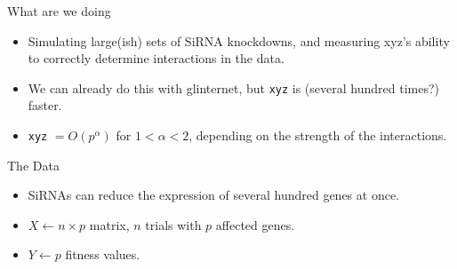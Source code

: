 \begin{frame}{What are we doing}
\begin{itemize}
	\item Simulating large(ish) sets of SiRNA knockdowns, and measuring xyz's ability to correctly determine interactions in the data.
	\item We can already do this with glinternet, but \texttt{xyz} is (several hundred times?) faster.
	\item \texttt{xyz} $= O(p^\alpha)$ for $1 < \alpha < 2$, depending on the strength of the interactions.
\end{itemize}
\end{frame}

\begin{frame}{The Data}
\begin{itemize}
	\item SiRNAs can reduce the expression of several hundred genes at once.
	\item $X \leftarrow n \times p$ matrix, $n$ trials with $p$ affected genes.
	\item $Y \leftarrow p$ fitness values.
\end{itemize}
\end{frame}


